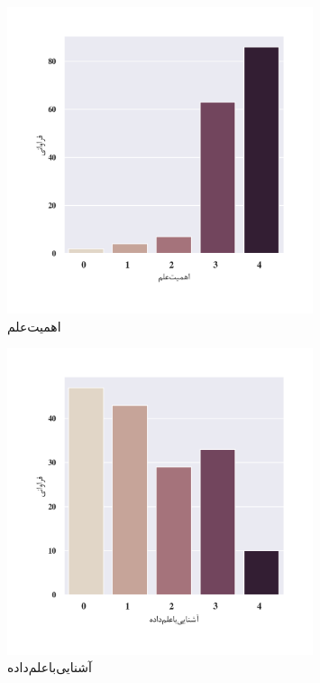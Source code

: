 \begin{figure}[htpb]
    \centering
    \includegraphics[width=0.8\textwidth]{./img/ordinal/ImportanceOfScience.png}
    \caption{اهمیت‌علم}
    \label{fig:ImportanceOfScience}
\end{figure}
\begin{figure}[htpb]
    \centering
    \includegraphics[width=0.8\textwidth]{./img/ordinal/DataScieneFamiliarity.png}
    \caption{آشنایی‌با‌علم‌داده}
    \label{fig:DataScieneFamiliarity}
\end{figure}

